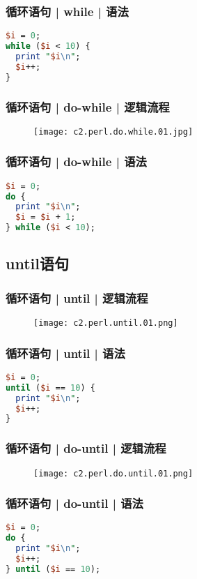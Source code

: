 \begin{frame}[fragile]
  \frametitle{循环语句 | while | \alert{语法}}
\begin{lstlisting}[language=Perl]
$i = 0;
while ($i < 10) {
  print "$i\n";
  $i++;
}
\end{lstlisting}
\end{frame}

\begin{frame}
  \frametitle{循环语句 | do-while | 逻辑流程}
  \begin{figure}
    \centering
    \texttt{[image: c2.perl.do.while.01.jpg]}
  \end{figure}
\end{frame}

\begin{frame}[fragile]
  \frametitle{循环语句 | do-while | 语法}
\begin{lstlisting}[language=Perl]
$i = 0;
do {
  print "$i\n";
  $i = $i + 1;
} while ($i < 10);
\end{lstlisting}
\end{frame}

\subsection{until语句}
\begin{frame}
  \frametitle{循环语句 | until | 逻辑流程}
  \begin{figure}
    \centering
    \texttt{[image: c2.perl.until.01.png]}
  \end{figure}
\end{frame}

\begin{frame}[fragile]
  \frametitle{循环语句 | until | \alert{语法}}
\begin{lstlisting}[language=Perl]
$i = 0;
until ($i == 10) {
  print "$i\n";
  $i++;
}
\end{lstlisting}
\end{frame}

\begin{frame}
  \frametitle{循环语句 | do-until | 逻辑流程}
  \begin{figure}
    \centering
    \texttt{[image: c2.perl.do.until.01.png]}
  \end{figure}
\end{frame}

\begin{frame}[fragile]
  \frametitle{循环语句 | do-until | 语法}
\begin{lstlisting}[language=Perl]
$i = 0;
do {
  print "$i\n";
  $i++;
} until ($i == 10);
\end{lstlisting}
\end{frame}

